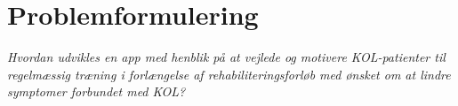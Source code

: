 \section{Problemformulering}
\textit{Hvordan udvikles en app med henblik på at vejlede og motivere KOL-patienter til regelmæssig træning i forlængelse af rehabiliteringsforløb med ønsket om at lindre symptomer forbundet med KOL? }
